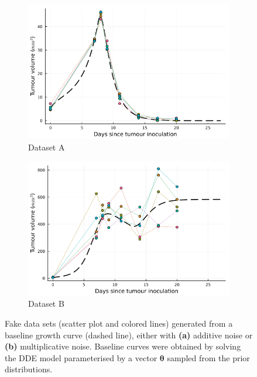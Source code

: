 \documentclass[11pt]{article}
\begin{document}
\begin{figure}[!h]
    \centering
    \begin{subfigure}{.5\linewidth}
        \centering\includegraphics[scale=0.4]{model_validation/fd_1.png}
        \caption{Dataset A}
    \end{subfigure}%
    \begin{subfigure}{.5\linewidth}
        \centering\includegraphics[scale=0.4]{model_validation/fd_2.png}
        \caption{Dataset B}
    \end{subfigure}
    \caption{Fake data sets (scatter plot and colored lines) generated from a baseline growth curve (dashed line), either with \textbf{(a)} additive noise or \textbf{(b)} multiplicative noise. Baseline curves were obtained by solving the DDE model parameterised by a vector $\boldsymbol{\theta}$ sampled from the prior distributions.}
    \label{fig:fd_1}
\end{figure}
\end{document}
